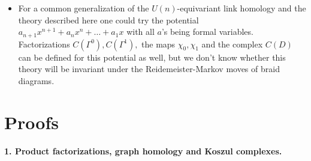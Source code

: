 \documentclass[12pt]{article}
\begin{document}
\begin{itemize}
of $sl(n)$ link homology. The invariant of the empty link should be the 
ring of polynomials in $a_1, \dots, a_n,$ and naturally isomorphic to the 
$U(n)$-equivariant cohomology ring of the point. The invariant of the unknot 
should be the quotient of the polynomial ring $\Q[x,a_1, \dots, a_n]$ by 
the relation $x^{n+1}+a_n x^n + \dots + a_1 x=0,$ isomorphic to 
the $U(n)$-equivariant cohomology ring of $\mathbb{CP}^n.$ A certain 
version of Bar-Natan link homology [BN], [K]  should correspond to the  
 potential $x^3+ a x.$ 
\item For a common generalization of the $U(n)$-equivariant link homology 
and the theory described here one could try the potential 
$a_{n+1}x^{n+1}+a_n x^n + \dots + a_1 x$ with all $a$'s being 
formal variables. Factorizations $C(\Gamma^0), C(\Gamma^1),$ the maps 
$\chi_0, \chi_1$ and the complex $C(D)$ can be defined for this potential 
as well, but we don't know whether this theory will be invariant under 
the Reidemeister-Markov moves of braid diagrams. 
\end{itemize} 





\section{Proofs} \label{sec-proofs}

\vspace{0.05in} 

{\bf 1. Product factorizations, graph homology and Koszul complexes.} 
\end{document}
